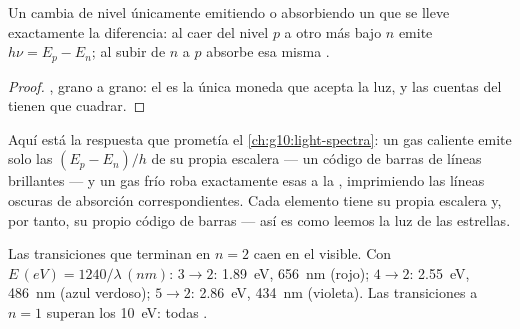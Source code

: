 \begin{theorem}\label{thm:g12:quantum-world:transition}
Un  cambia de nivel únicamente emitiendo o absorbiendo un  que se lleve
exactamente la diferencia: al caer del nivel $p$ a otro más bajo $n$ emite
$h\nu = E_p - E_n$; al subir de $n$ a $p$ absorbe esa misma .
\end{theorem}

\begin{proof}
, grano a grano: el  es la única moneda que acepta la
luz, y las cuentas del  tienen que cuadrar.
\end{proof}

\begin{remark}\label{rem:g12:quantum-world:lines}
Aquí está la respuesta que prometía el \cref{ch:g10:light-spectra}: un gas caliente
emite solo las  $(E_p - E_n)/h$ de su propia escalera --- un código de
barras de líneas brillantes --- y un gas frío roba exactamente esas  a la
, imprimiendo las líneas oscuras de absorción correspondientes. Cada
elemento tiene su propia escalera y, por tanto, su propio código de barras --- así es
como leemos la luz de las estrellas.
\end{remark}

\begin{example}\label{ex:g12:quantum-world:balmer}
Las transiciones que terminan en $n = 2$ caen en el visible. Con
$E \,(\unit{eV}) = 1240/\lambda\,(\unit{nm})$: $3 \to 2$: \qty{1.89}{eV},
\qty{656}{nm} (rojo); $4 \to 2$: \qty{2.55}{eV}, \qty{486}{nm} (azul verdoso);
$5 \to 2$: \qty{2.86}{eV}, \qty{434}{nm} (violeta). Las transiciones a $n = 1$ superan
los \qty{10}{eV}: todas .
\end{example}

